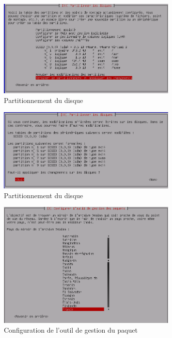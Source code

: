\documentclass[11pt,a4paper,titlepage, oneside]{article}
\begin{document}
		\begin{figure}[htp]
                        \centering
                        \includegraphics[width=0.8\textwidth,natwidth=610,natheight=642]{images/debian15.png}
                        \caption{Partitionnement du disque}
		\end{figure}
	
		\begin{figure}[htp]
                        \centering
                        \includegraphics[width=0.8\textwidth,natwidth=610,natheight=642]{images/debian16.png}
                        \caption{Partitionnement du disque}
		\end{figure}

		\begin{figure}[htp]
                        \centering
                        \includegraphics[width=0.8\textwidth,natwidth=610,natheight=642]{images/debian17.png}
                        \caption{Configuration de l'outil de gestion du paquet}
		\end{figure}
\end{document}
